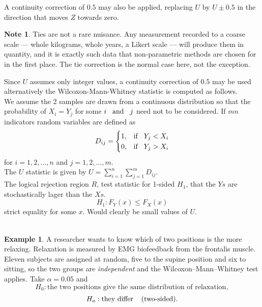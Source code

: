 \documentclass[11pt,a4paper]{article}
\theoremstyle{definition}
\newtheorem{example}[thm]{Example}
\newtheorem{note}[thm]{Note}
\begin{document}
A continuity correction of $0.5$ may also be applied, replacing $U$ by
$U \pm 0.5$ in the direction that moves $Z$ towards zero.

\begin{note}
Ties are not a rare nuisance. Any measurement recorded to a coarse scale --- whole
kilograms, whole years, a Likert scale --- will produce them in quantity, and it is
exactly such data that non-parametric methods are chosen for in the first place.
The tie correction is the normal case here, not the exception.
\end{note}



Since $U$ assumes only integer values, a continuity correction of $0.5$ may be used alternatively the Wilcoxon-Mann-Whitney statistic is computed as follows.\\ 
We assume the 2 samples are drawn from a continuous distribution so that the probability of $X_i=Y_j$ for some $i\hspace{0.3cm} \text{and}\hspace{0.3cm} j$ need not to be considered. If $mn$ indicators random variables are defined as 
\[D_{ij}=
\begin{cases}
1, &\text{if}\hspace{0.3cm} Y_j<X_i\\
0, &\text{if}\hspace{0.3cm} Y_j>X_i\\
\end{cases}
\] for $i=1,2,\dots,n$ and $j=1,2,\dots,m$.\\


The $U$ statistic is given by \hspace{0.2cm}$\displaystyle{U=\sum^n_{i=1}\sum^m_{j=1}D_{ij}}.$\\

The logical rejection region $R$, test statistic for 1-sided $H_1$, that the $Ys$ are stochastically lager than the $Xs$. $$H_1:F_Y(x)\leq F_X(x)$$ strict equality for some $x$. Would clearly be small values of $U$.\\\\



\begin{example}
A researcher wants to know which of two positions is the more relaxing. Relaxation
is measured by EMG biofeedback from the frontalis muscle. Eleven subjects are
assigned at random, five to the supine position and six to sitting, so the two
groups are \emph{independent} and the Wilcoxon--Mann--Whitney test applies. Take
$\alpha=0.05$ and
$$H_0:\text{the two positions give the same distribution of relaxation},$$
$$H_a:\text{they differ}\hspace{0.4cm}(\text{two-sided}).$$
\end{example}
\end{document}
